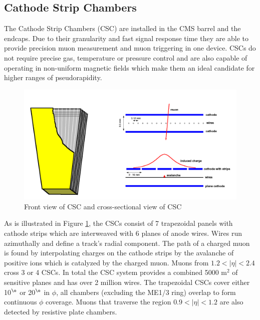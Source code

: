 \subsection{Cathode Strip Chambers}
The Cathode Strip Chambers (CSC) are installed in the CMS barrel and the endcaps.
Due to their granularity and fast signal response time they are able to provide precision muon 
measurement and muon triggering in one device. CSCs do not 
require precise gas, temperature or pressure control and are also capable of operating
in non-uniform magnetic fields which make them an ideal candidate for higher
ranges of pseudorapidity. 
\begin{figure}[hb]
  \centering
	\includegraphics[width=1\textwidth]{images/CSC2images.png}
  	\caption[Cathode Strip Chambers]
   	{Front view of CSC and cross-sectional view of CSC}
	\label{fig:cscImage}
\end{figure}
As is illustrated in Figure \ref{fig:cscImage},
the CSCs consist of 7 trapezoidal panels with cathode strips which are interweaved with
6 planes of anode wires. Wires run azimuthally and define a track's 
radial component. The path of a charged muon is found by interpolating charges
on the cathode strips by the avalanche of positive ions which is catalyzed by
the charged muon. 
Muons from $1.2<|\eta|<2.4$ cross 3 or 4 CSCs. In total the CSC system provides
a combined 5000 m$^2$ of sensitive planes and has over 2 million wires.
The trapezoidal CSCs cover either 10$^{\o}$ or 20$^{\o}$ in $\phi$, all chambers
(excluding the ME1/3 ring) overlap to form continuous $\phi$ coverage.
Muons that traverse the region $0.9<|\eta|<1.2$ are also detected by resistive plate chambers. 

